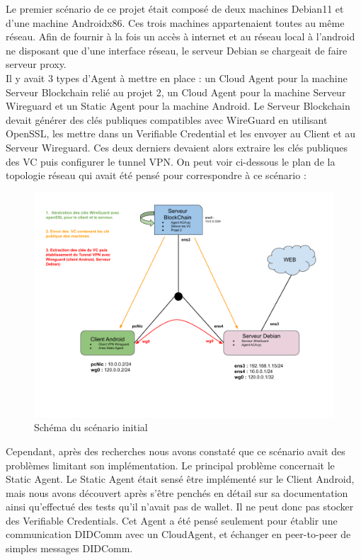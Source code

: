 \documentclass[12pt, openany]{report}
\begin{document}
\begin{flushleft}
Le premier scénario de ce projet était composé de deux machines Debian11 et d'une machine Androidx86. Ces trois machines appartenaient toutes au même réseau. Afin de fournir à la fois un accès à internet et au réseau local à l'android ne disposant que d'une interface réseau, le serveur Debian se chargeait de faire serveur proxy.\\
\vspace{2mm}
Il y avait 3 types d'Agent à mettre en place : un Cloud Agent pour la machine Serveur Blockchain relié au projet 2, un Cloud Agent pour la machine Serveur Wireguard et un Static Agent pour la machine Android. Le Serveur Blockchain devait générer des clés publiques compatibles avec WireGuard en utilisant OpenSSL, les mettre dans un Verifiable Credential et les envoyer au Client et au Serveur Wireguard. Ces deux derniers devaient alors extraire les clés publiques des VC puis configurer le tunnel VPN. On peut voir ci-dessous le plan de la topologie réseau qui avait été pensé pour correspondre à ce scénario :

\begin{figure}[H]
\includegraphics[width=\textwidth]{scenario1.png}
\centering
\caption{Schéma du scénario initial}
\end{figure}

Cependant, après des recherches nous avons constaté que ce scénario avait des problèmes limitant son implémentation. Le principal problème concernait le Static Agent. Le Static Agent était sensé être implémenté sur le Client Android, mais nous avons découvert après s'être penchés en détail sur sa documentation ainsi qu'effectué des tests qu'il n'avait pas de wallet. Il ne peut donc pas stocker des Verifiable Credentials. Cet Agent a été pensé seulement pour établir une communication DIDComm avec un CloudAgent, et échanger en peer-to-peer de simples messages DIDComm.
\end{flushleft}
\end{document}
